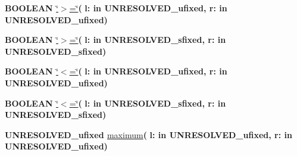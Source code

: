 \begin{DoxyCompactItemize}
\item 
{\bfseries {\bfseries \textcolor{comment}{B\+O\+O\+L\+E\+A\+N}\textcolor{vhdlchar}{ }}} \hyperlink{class__fixed__pkg_ae5388d5c75013b9b70d7c00870e790fb}{\char`\"{}$>$=\char`\"{}}{\bfseries  ( }{\bfseries \textcolor{vhdlchar}{l\+: }\textcolor{stringliteral}{in }\textcolor{vhdlchar}{U\+N\+R\+E\+S\+O\+L\+V\+E\+D\+\_\+ufixed}}{\bfseries  , \textcolor{vhdlchar}{r\+: }\textcolor{stringliteral}{in }\textcolor{vhdlchar}{U\+N\+R\+E\+S\+O\+L\+V\+E\+D\+\_\+ufixed}}{\bfseries  )} 
\item 
{\bfseries {\bfseries \textcolor{comment}{B\+O\+O\+L\+E\+A\+N}\textcolor{vhdlchar}{ }}} \hyperlink{class__fixed__pkg_ae5388d5c75013b9b70d7c00870e790fb}{\char`\"{}$>$=\char`\"{}}{\bfseries  ( }{\bfseries \textcolor{vhdlchar}{l\+: }\textcolor{stringliteral}{in }\textcolor{vhdlchar}{U\+N\+R\+E\+S\+O\+L\+V\+E\+D\+\_\+sfixed}}{\bfseries  , \textcolor{vhdlchar}{r\+: }\textcolor{stringliteral}{in }\textcolor{vhdlchar}{U\+N\+R\+E\+S\+O\+L\+V\+E\+D\+\_\+sfixed}}{\bfseries  )} 
\item 
{\bfseries {\bfseries \textcolor{comment}{B\+O\+O\+L\+E\+A\+N}\textcolor{vhdlchar}{ }}} \hyperlink{class__fixed__pkg_ab0154e9ed0efde2e95402ec9c4433043}{\char`\"{}$<$=\char`\"{}}{\bfseries  ( }{\bfseries \textcolor{vhdlchar}{l\+: }\textcolor{stringliteral}{in }\textcolor{vhdlchar}{U\+N\+R\+E\+S\+O\+L\+V\+E\+D\+\_\+ufixed}}{\bfseries  , \textcolor{vhdlchar}{r\+: }\textcolor{stringliteral}{in }\textcolor{vhdlchar}{U\+N\+R\+E\+S\+O\+L\+V\+E\+D\+\_\+ufixed}}{\bfseries  )} 
\item 
{\bfseries {\bfseries \textcolor{comment}{B\+O\+O\+L\+E\+A\+N}\textcolor{vhdlchar}{ }}} \hyperlink{class__fixed__pkg_ab0154e9ed0efde2e95402ec9c4433043}{\char`\"{}$<$=\char`\"{}}{\bfseries  ( }{\bfseries \textcolor{vhdlchar}{l\+: }\textcolor{stringliteral}{in }\textcolor{vhdlchar}{U\+N\+R\+E\+S\+O\+L\+V\+E\+D\+\_\+sfixed}}{\bfseries  , \textcolor{vhdlchar}{r\+: }\textcolor{stringliteral}{in }\textcolor{vhdlchar}{U\+N\+R\+E\+S\+O\+L\+V\+E\+D\+\_\+sfixed}}{\bfseries  )} 
\item 
{\bfseries {\bfseries \textcolor{vhdlchar}{U\+N\+R\+E\+S\+O\+L\+V\+E\+D\+\_\+ufixed}\textcolor{vhdlchar}{ }}} \hyperlink{class__fixed__pkg_aaa583443bea04e0ef9aec0f01379504e}{maximum}{\bfseries  ( }{\bfseries \textcolor{vhdlchar}{l\+: }\textcolor{stringliteral}{in }\textcolor{vhdlchar}{U\+N\+R\+E\+S\+O\+L\+V\+E\+D\+\_\+ufixed}}{\bfseries  , \textcolor{vhdlchar}{r\+: }\textcolor{stringliteral}{in }\textcolor{vhdlchar}{U\+N\+R\+E\+S\+O\+L\+V\+E\+D\+\_\+ufixed}}{\bfseries  )} 

\end{DoxyCompactItemize}
